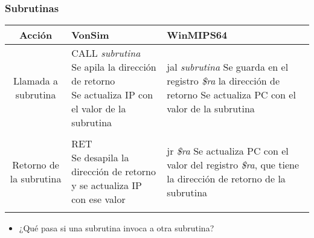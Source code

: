\documentclass{beamer}
\begin{document}
\begin{frame}
\frametitle{Subrutinas}

\tiny{
\begin{tabular}{| c | p{3.5cm} | p{3.5cm} |}
\hline
Acción & VonSim & WinMIPS64 \\ \hline
Llamada a subrutina &
\parbox{3.5cm}{CALL \emph{subrutina} \\
	Se apila la dirección de retorno \\
	Se actualiza IP con el valor de la subrutina } &
\parbox{3.5cm}{jal \emph{subrutina} \\
Se guarda en el registro \emph{\$ra} la dirección de retorno \\
Se actualiza PC con el valor de la subrutina}
\\ & & \\ \hline


Retorno de la subrutina &
\parbox{3.5cm}{RET \\
	Se desapila la dirección de retorno y se  actualiza IP con ese valor } &
\parbox{3.5cm}{jr \emph{\$ra} \\
Se actualiza PC con el valor del registro \emph{\$ra}, que tiene la dirección de retorno de la subrutina}
\\ & & \\ \hline

\end{tabular}
}

\begin{itemize}
\item ¿Qué pasa si una subrutina invoca a otra subrutina?
\end{itemize}


\end{frame}
\end{document}
